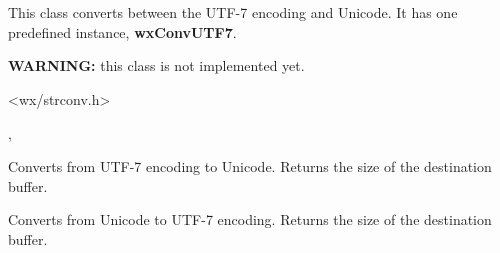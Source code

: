 %
%

\section{}\label{wxmbconvutf7}

This class converts between the UTF-7 encoding and Unicode.
It has one predefined instance, {\bf wxConvUTF7}.

{\bf WARNING:} this class is not implemented yet.




<wx/strconv.h>


, 


\label{wxmbconvutf7mb2wc}


Converts from UTF-7 encoding to Unicode. Returns the size of the destination buffer.

\label{wxmbconvutf7wc2mb}


Converts from Unicode to UTF-7 encoding. Returns the size of the destination buffer.

